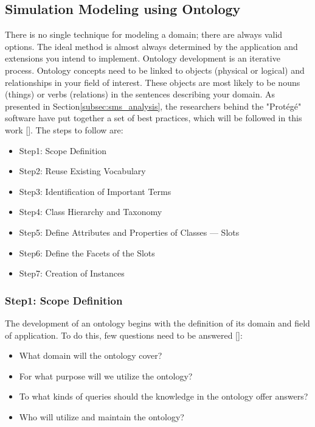 \subsection{Simulation Modeling using Ontology}
There is no single technique for modeling a domain; there are always valid options. The ideal method is almost always determined by the application and extensions you intend to implement. Ontology development is an iterative process. Ontology concepts need to be linked to objects (physical or logical) and relationships in your field of interest. These objects are most likely to be nouns (things) or verbs (relations) in the sentences describing your domain. As presented in Section\ref{subsec:sms_analysis}, the researchers behind the "Protégé" software have put together a set of best practices, which will be followed in this work []. The steps to follow are:

\begin{itemize}
    \item Step1: Scope Definition
    \item Step2: Reuse Existing Vocabulary
    \item Step3: Identification of Important Terms
    \item Step4: Class Hierarchy and Taxonomy
    \item Step5: Define Attributes and Properties of Classes — Slots
    \item Step6: Define the Facets of the Slots
    \item Step7: Creation of Instances
\end{itemize}

    \subsubsection{Step1: Scope Definition}
    The development of an ontology begins with the definition of its domain and field of application. To do this, few questions need to be answered []:
    
    \begin{itemize}
        \item What domain will the ontology cover? 
        \item For what purpose will we utilize the ontology? 
        \item To what kinds of queries should the knowledge in the ontology offer answers? 
        \item Who will utilize and maintain the ontology?
    \end{itemize}
    
